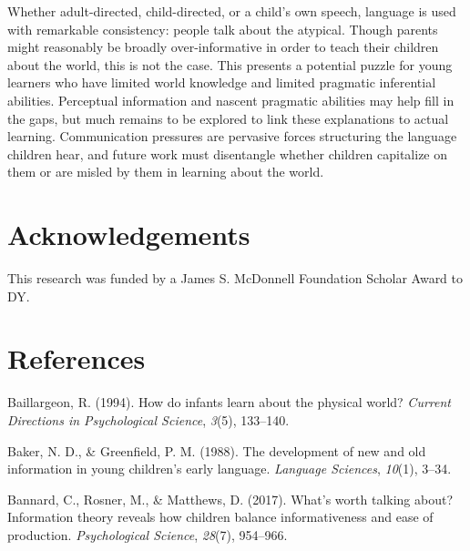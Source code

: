 \documentclass[10pt, letterpaper]{article}
\begin{document}
Whether adult-directed, child-directed, or a child's own speech,
language is used with remarkable consistency: people talk about the
atypical. Though parents might reasonably be broadly over-informative in
order to teach their children about the world, this is not the case.
This presents a potential puzzle for young learners who have limited
world knowledge and limited pragmatic inferential abilities. Perceptual
information and nascent pragmatic abilities may help fill in the gaps,
but much remains to be explored to link these explanations to actual
learning. Communication pressures are pervasive forces structuring the
language children hear, and future work must disentangle whether
children capitalize on them or are misled by them in learning about the
world.

\vspace{1em} 

\hypertarget{acknowledgements}{%
\section{Acknowledgements}\label{acknowledgements}}

This research was funded by a James S. McDonnell Foundation Scholar
Award to DY.

\hypertarget{references}{%
\section{References}\label{references}}

\setlength{\parindent}{-0.1in} 
\setlength{\leftskip}{0.125in}

\noindent

\hypertarget{refs}{}
\leavevmode\hypertarget{ref-baillargeon1994}{}%
Baillargeon, R. (1994). How do infants learn about the physical world?
\emph{Current Directions in Psychological Science}, \emph{3}(5),
133--140.

\leavevmode\hypertarget{ref-baker1988}{}%
Baker, N. D., \& Greenfield, P. M. (1988). The development of new and
old information in young children's early language. \emph{Language
Sciences}, \emph{10}(1), 3--34.

\leavevmode\hypertarget{ref-bannard2017}{}%
Bannard, C., Rosner, M., \& Matthews, D. (2017). What's worth talking
about? Information theory reveals how children balance informativeness
and ease of production. \emph{Psychological Science}, \emph{28}(7),
954--966.
\end{document}
